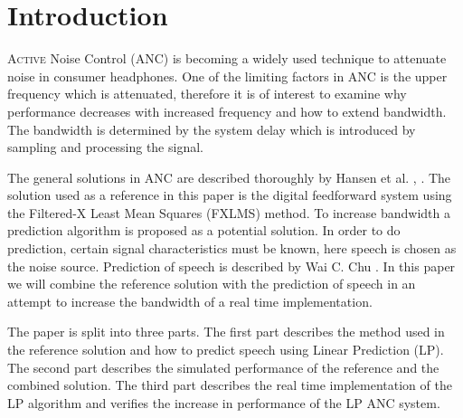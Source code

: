 \section{Introduction}
\lettrine[lines=2]{A}{ctive} Noise Control (ANC) is becoming a widely used technique to attenuate noise in consumer headphones. One of the limiting factors in ANC is the upper frequency which is attenuated, therefore it is of interest to examine why performance decreases with increased frequency and how to extend bandwidth. The bandwidth is determined by the system delay which is introduced by sampling and processing the signal.   

The general solutions in ANC are described thoroughly by Hansen et al. \cite{Hansen2}, \cite{Hansen}. The solution used as a reference in this paper is the digital feedforward system using the Filtered-X Least Mean Squares (FXLMS) method. To increase bandwidth a prediction algorithm is proposed as a potential solution. In order to do prediction, certain signal characteristics must be known, here speech is chosen as the noise source. Prediction of speech is described by Wai C. Chu \cite{Speech}. In this paper we will combine the reference solution with the prediction of speech in an attempt to increase the bandwidth of a real time implementation.  

The paper is split into three parts. The first part describes the method used in the reference solution and how to predict speech using Linear Prediction (LP). The second part describes the simulated performance of the reference and the combined solution. The third part describes the real time implementation of the LP algorithm and verifies the increase in performance of the LP ANC system.  
        









